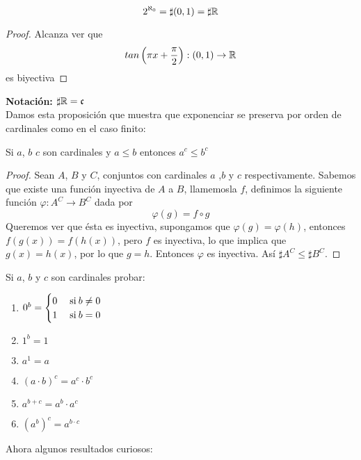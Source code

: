 \documentclass[12pt,a4paper]{book}
\begin{document}
\begin{cor}
$$ 2^{\aleph_0}=\sharp (0,1) = \sharp \mathbb{R}$$
\begin{proof}
Alcanza ver que 
$$ tan\left(\pi x+\frac{\pi}{2}\right): (0,1) \rightarrow \mathbb{R}$$
es biyectiva
\end{proof}
\end{cor}
\textbf{Notación:} $ \sharp \mathbb{R} = \mathfrak{c}$ \\[0.5cm]
Damos esta proposición que muestra que exponenciar se preserva por orden de cardinales como en el caso finito:
\begin{prop}
Si $a$, $b$ $c$ son cardinales y $ a \leq b$ entonces $a^c \leq b^c$
\begin{proof}
Sean $A$, $B$ y $C$, conjuntos con cardinales $a$ ,$b$ y $c$ respectivamente. Sabemos que existe una función inyectiva de $A$ a $B$, llamemosla $f$, definimos la siguiente función $\varphi:A^C \rightarrow B^C$ dada por
$$ \varphi(g) = f \circ g$$
Queremos ver que ésta es inyectiva, supongamos que $\varphi(g)=\varphi(h)$, entonces $f(g(x)) = f(h(x))$, pero $f$ es inyectiva, lo que implica que $g(x)=h(x)$, por lo que $g=h$. Entonces $\varphi$ es inyectiva. Así $\sharp A^C \leq \sharp B^C$.
\end{proof}
\end{prop}
\begin{ej}
Si $a$, $b$ y $c$ son cardinales probar:
\begin{enumerate}
\item $0^b = \begin{cases} 0 &\mathrm{\;si\:} b \neq 0 \\ 1 &\mathrm{\;si\:} b = 0 \end{cases}$
\item $1^b = 1$
\item $a^1 = a$
\item $(a \cdot b)^c = a^c \cdot b^c$
\item $ a^{b+c} = a^b \cdot a^c$
\item $ (a^b)^c = a^{b \cdot c}$
\end{enumerate}
\end{ej}
Ahora algunos resultados curiosos:
\end{document}
